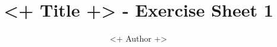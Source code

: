 \documentclass[a4paper,11pt,english]{article}
\title{\textbf{<+ Title +>} - Exercise Sheet 1}
\author{<+ Author +>}
\begin{document}
\mmaketitle

\begin{exercise}[1]
\end{exercise} 
\end{document}
